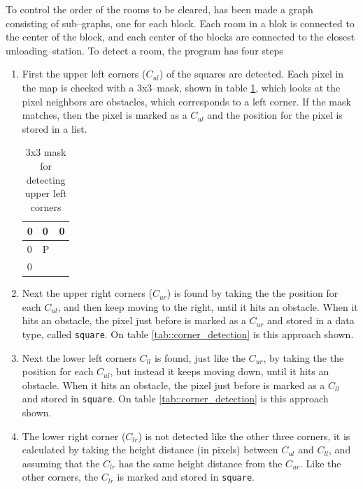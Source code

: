To control the order of the rooms to be cleared, has been made a graph consisting of sub--graphs, one for each block. Each room in a blok is connected to the center of the block, and each center of the blocks are connected to the closest unloading--station. To detect a room, the program has four steps
\begin{enumerate}\itemsep-3pt
\item First the upper left corners ($C_{ul}$) of the squares are detected. Each pixel in the map is checked with a 3x3--mask, shown in table \ref{tab::ul_mask}, which looks at the pixel neighbors are obstacles, which corresponds to a left corner. If the mask matches, then the pixel is marked as a $C_{ul}$ and the position for the pixel is stored in a list. 

\begin{table}[H]
\centering
\begin{tabular}{|l|l|l|}
\hline
0 & 0 & 0 \\ \hline
0 & P &   \\ \hline
0 &   &   \\ \hline
\end{tabular}
\caption{3x3 mask for detecting upper left corners}
\label{tab::ul_mask}
\end{table}

\item Next the upper right corners ($C_{ur}$) is found by taking the the position for each $C_{ul}$, and then keep moving to the right, until it hits an obstacle. When it hits an obstacle, the pixel just before is marked as a $C_{ur}$ and stored in a data type, called \lstinline|square|. On table \ref{tab::corner_detection} is this approach shown.
\item Next the lower left corners $C_{ll}$ is found, just like the $C_{ur}$, by taking the the position for each $C_{ul}$, but instead it keeps moving down, until it hits an obstacle. When it hits an obstacle, the pixel just before is marked as a $C_{ll}$ and stored in \lstinline|square|. On table \ref{tab::corner_detection} is this approach shown. 
\item The lower right corner ($C_{lr}$) is not detected like the other three corners, it is calculated by taking the height distance (in pixels) between $C_{ul}$ and $C_{ll}$, and assuming that the $C_{lr}$ has the same height distance from the $C_{ur}$. Like the other corners, the $C_{lr}$ is marked and stored in \lstinline|square|. 
\end{enumerate} 

